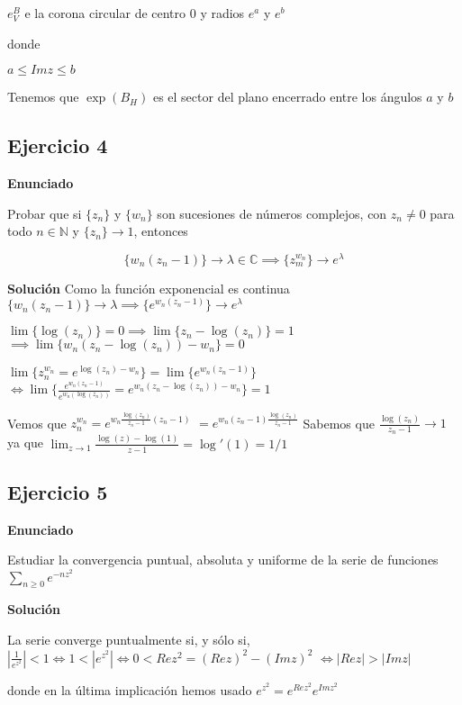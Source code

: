 $e^B_V$ e la corona circular de centro $0$ y radios $e^a$ y $e^b$

donde

$a\leq Imz \leq b$

Tenemos que $\exp(B_H)$ es el sector del plano encerrado entre los ángulos $a$ y $b$




\subsection{Ejercicio 4}
\textbf{Enunciado}

Probar que si $\{z_n\}$ y $\{w_n\}$ son sucesiones de números complejos, con $z_n \not = 0$ para todo
$n\in \mathbb{N}$ y $\{ z_n \} \rightarrow 1$, entonces

$$ \{w_n(z_n-1)\} \rightarrow \lambda\in\mathbb{C} \implies \{ z_m^{w_n} \}\rightarrow e^{\lambda} $$

\textbf{Solución}
Como la función exponencial es continua
$\{ w_n (z_n-1) \} \rightarrow \lambda \implies \{ e^{w_n(z_n-1)} \} \rightarrow e^{\lambda}$

$\lim \{ \log(z_n) \} = 0 \implies \lim \{ z_n-\log(z_n) \} = 1$
$\implies \lim \{ w_n(z_n-\log(z_n))-w_n \} = 0$

$\lim \{ z_n^{w_n} = e^{\log(z_n)-w_n} \}= \lim \{ e^{w_n (z_n-1)} \}$
$\Longleftrightarrow \lim\{ \frac{e^{w_n(z_n-1)}}{e^{w_n (\log(z_n))}} = e^{w_n (z_n-\log(z_n))-w_n} \} = 1$

Vemos que
$z_n^{w_n} = e^{w_n \frac{\log(z_n)}{z_n-1} (z_n-1)}$
$= e^{w_n (z_n-1) \frac{\log(z_n)}{z_n-1}}$
Sabemos que $ \frac{\log(z_n)}{z_n-1} \rightarrow 1$ ya que
$\lim_{z\rightarrow 1} \frac{\log(z)-\log(1)}{z-1} = \log'(1) = 1/1$





\subsection{Ejercicio 5}
\textbf{Enunciado}

Estudiar la convergencia puntual, absoluta y uniforme de la serie de funciones
$\sum_{n\geq 0} e^{-nz^2}$

\textbf{Solución}

La serie converge puntualmente si, y sólo si, $| \frac{1}{e^{z^2}} | <1 \Longleftrightarrow 1<|e^{z^2}|  \Longleftrightarrow 0<Rez^2 = (Rez)^2-(Imz)^2 $
$\Longleftrightarrow |Rez| > |Imz|$

donde en la última implicación hemos usado
$e^{z^2} = e^{Rez^2} e^{Imz^2}$


